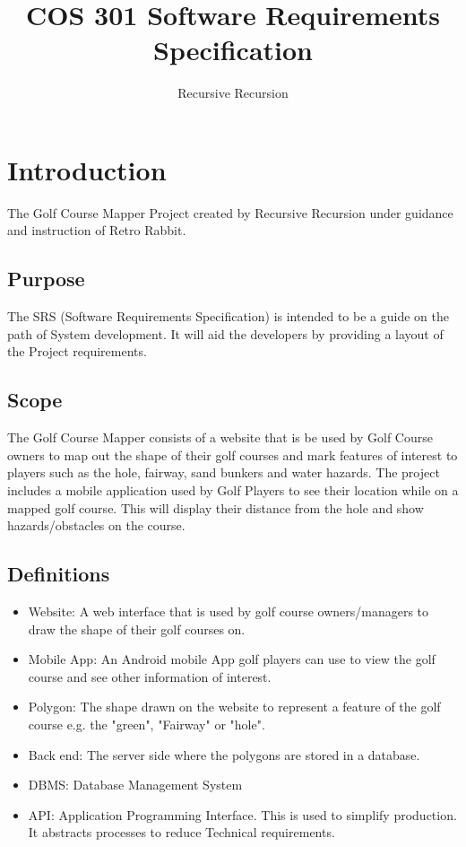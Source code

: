 \documentclass[12]{article}
\title{COS 301 Software Requirements Specification}
\date{}
\author{Recursive Recursion}
\begin{document}
\maketitle

\section{Introduction}
The Golf Course Mapper Project created by Recursive Recursion under guidance and instruction of Retro Rabbit.
\subsection{Purpose}
The SRS (Software Requirements Specification) is intended to be a guide on the path of System development. It will aid the developers by providing a layout of the Project requirements.
\subsection{Scope}
 The Golf Course Mapper consists of a website that is be used by Golf Course owners to map out the shape of their golf courses and mark features of interest to players such as the hole, fairway, sand bunkers and water hazards. The project includes a mobile application used by Golf Players to see their location while on a mapped golf course. This will display their distance from the hole and show hazards/obstacles on the course.
\subsection{Definitions}
\begin{itemize}
	\item
	Website: A web interface that is used by golf course owners/managers to draw the shape of their golf courses on.
	\item
	Mobile App: An Android mobile App golf players can use to view the golf course and see other information of interest.
	\item
	Polygon: The shape drawn on the website to represent a feature of the golf course e.g. the "green", "Fairway" or "hole".
	\item
	Back end: The server side where the polygons are stored in a database.
	\item
	DBMS: Database Management System	
	\item
	API: Application Programming Interface. This is used to simplify production. It abstracts processes to reduce Technical requirements.
\end{itemize}
\end{document}
